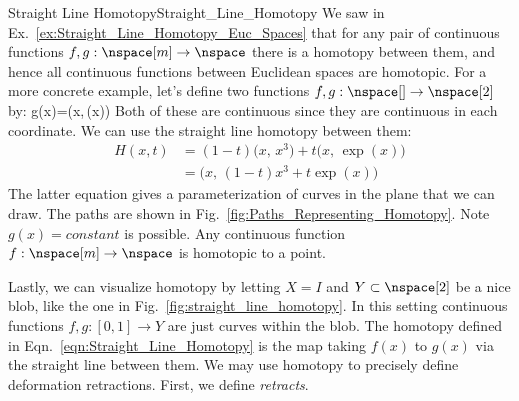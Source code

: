         \begin{lexample}{Straight Line Homotopy}{Straight_Line_Homotopy}
            We saw in Ex.~\ref{ex:Straight_Line_Homotopy_Euc_Spaces}
            that for any pair of continuous functions
            $f,g:\nspace[m]\rightarrow\nspace$ there is a homotopy
            between them, and hence all continuous functions between
            Euclidean spaces are homotopic. For a more concrete example,
            let's define two functions
            $f,g:\nspace[]\rightarrow\nspace[2]$ by:
                        {g(x)=\big(x,\,\exp(x)\big)}
            Both of these are continuous since they are continuous in
            each coordinate. We can use the straight line homotopy
            between them:
            \begin{subequations}
                \begin{align}
                    H(x,t)
                    &=(1-t)\big(x,\,x^{3}\big)+t\big(x,\,\exp(x)\big)\\
                    &=\big(x,\,(1-t)x^{3}+t\exp(x)\big)
                \end{align}
            \end{subequations}
            The latter equation gives a parameterization of curves in
            the plane that we can draw. The paths are shown in
            Fig.~\ref{fig:Paths_Representing_Homotopy}. Note
            $g(x)=constant$ is possible. Any continuous function
            $f:\nspace[m]\rightarrow\nspace$ is homotopic to a point.
        \end{lexample}
        \begin{minipage}{0.56\textwidth}
            Lastly, we can visualize homotopy by letting $X=I$ and
            $Y\subset\nspace[2]$ be a nice blob, like the one in
            Fig.~\ref{fig:straight_line_homotopy}. In this setting
            continuous functions $f,g:[0,1]\rightarrow{Y}$ are just
            curves within the blob. The homotopy defined in
            Eqn.~\ref{eqn:Straight_Line_Homotopy} is the map taking
            $f(x)$ to $g(x)$ via the straight line between them. We may
            use homotopy to precisely define deformation retractions.
            First, we define \textit{retracts}.
        \end{minipage}
        \hfill
